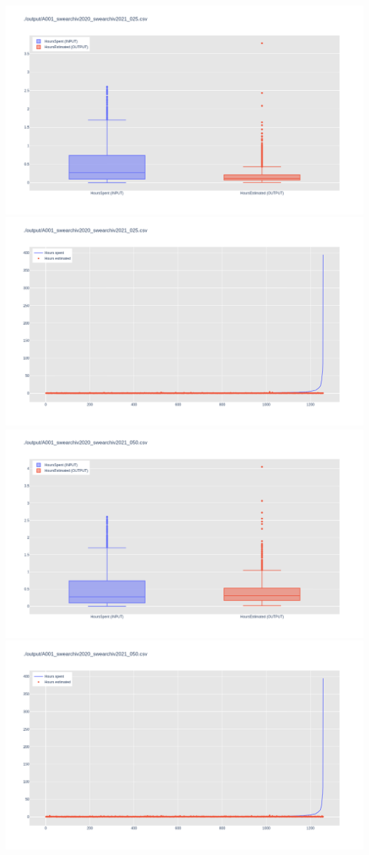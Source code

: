\includegraphics[width=\textwidth]{Scripts/output/A001_swearchiv2020_swearchiv2021_025.csv.png}
\includegraphics[width=\textwidth]{Scripts/output/A001_swearchiv2020_swearchiv2021_025.csv.scatter.png}
\includegraphics[width=\textwidth]{Scripts/output/A001_swearchiv2020_swearchiv2021_050.csv.png}
\includegraphics[width=\textwidth]{Scripts/output/A001_swearchiv2020_swearchiv2021_050.csv.scatter.png}
